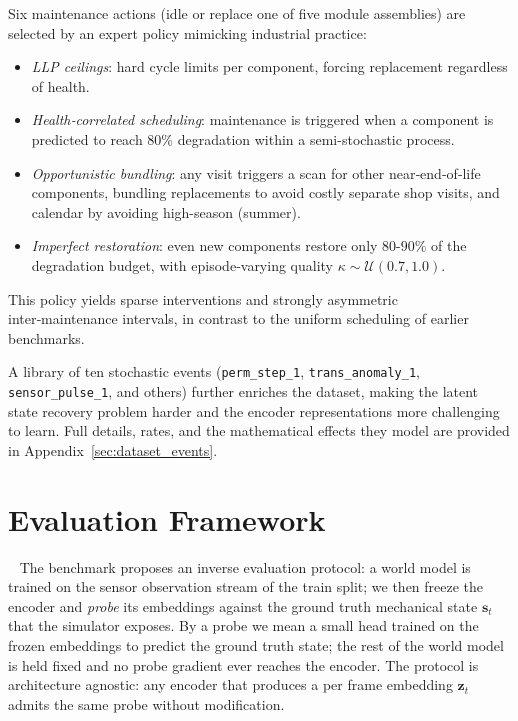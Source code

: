 \documentclass{article}
\begin{document}
Six maintenance actions (idle or replace one of five module assemblies) are selected by an expert policy mimicking industrial practice:
\begin{itemize}
    \item \textit{LLP ceilings}: hard cycle limits per component, forcing replacement regardless of health.
    \item \textit{Health‑correlated scheduling}: maintenance is triggered when a component is predicted to reach 80\% degradation within a semi-stochastic process.
    \item \textit{Opportunistic bundling}: any visit triggers a scan for other near‑end‑of‑life components, bundling replacements to avoid costly separate shop visits, and calendar by avoiding high-season (summer).
    \item \textit{Imperfect restoration}: even new components restore only $80$-$90\%$ of the degradation budget, with episode‑varying quality $\kappa\sim\mathcal{U}(0.7,1.0)$.
\end{itemize}

This policy yields sparse interventions and strongly asymmetric inter‑maintenance intervals, in contrast to the uniform scheduling of earlier benchmarks.

A library of ten stochastic events (\texttt{perm\_step\_1},
\texttt{trans\_anomaly\_1}, \texttt{sensor\_pulse\_1}, and others) further enriches the dataset, making the latent state recovery problem harder and the encoder representations more challenging to learn. Full details, rates, and the mathematical effects they model are provided in
Appendix~\ref{sec:dataset_events}.


\section{Evaluation Framework}~\label{sec:evaluation}
The benchmark proposes an inverse evaluation protocol: a world model is trained on the sensor observation stream of the train split; we then freeze the encoder and \emph{probe} its embeddings against the ground truth mechanical state $\mathbf{s}_t$ that the simulator exposes. By a probe we mean a small head trained on the frozen embeddings to predict the ground truth state; the rest of the world model is held fixed and no probe gradient ever reaches the encoder. The protocol is architecture agnostic: any encoder that produces a per frame embedding $\mathbf{z}_t$ admits the same probe
without modification.
\end{document}
